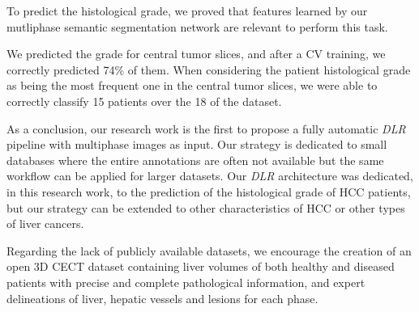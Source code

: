 To predict the histological grade, we proved that features learned by
our mutliphase semantic segmentation network are relevant to perform
this task.

We predicted the grade for central tumor slices, and after a CV
training, we correctly predicted 74\% of them. When considering the
patient histological grade as being the most frequent one in the central
tumor slices, we were able to correctly classify 15 patients over the 18
of the dataset.

As a conclusion, our research work is the first to propose a fully
automatic \emph{DLR} pipeline with multiphase images as input. Our
strategy is dedicated to small databases where the entire annotations
are often not available but the same workflow can be applied for larger
datasets. Our \emph{DLR} architecture was dedicated, in this research
work, to the prediction of the histological grade of HCC patients, but
our strategy can be extended to other characteristics of HCC or other
types of liver cancers.

Regarding the lack of publicly available datasets, we encourage the
creation of an open 3D CECT dataset containing liver volumes of both
healthy and diseased patients with precise and complete pathological
information, and expert delineations of liver, hepatic vessels and
lesions for each phase.

